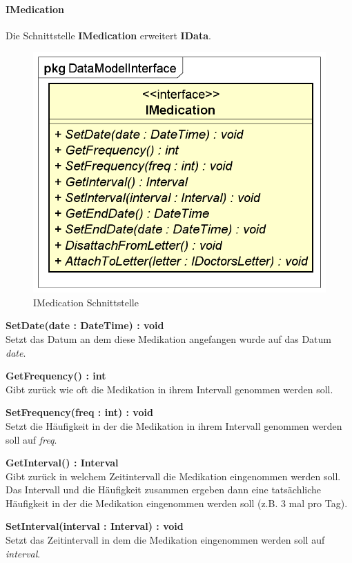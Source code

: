 \documentclass[a4paper]{scrreprt}
\begin{document}
\paragraph{IMedication}
Die Schnittstelle \textbf{IMedication} erweitert \textbf{IData}.

\begin{figure}[H]
\centering
\includegraphics[width=0.55\textheight]{graphics/Klassendiagramme/Model/IMedication.png}
\caption{IMedication Schnittstelle}
\end{figure}
\textbf{SetDate(date : DateTime) : void}\\
Setzt das Datum an dem diese Medikation angefangen wurde auf das Datum \textit{date}.

\textbf{GetFrequency() : int}\\
Gibt zurück wie oft die Medikation in ihrem Intervall genommen werden soll.

\textbf{SetFrequency(freq : int) : void}\\
Setzt die Häufigkeit in der die Medikation in ihrem Intervall genommen werden soll auf \textit{freq}.

\textbf{GetInterval() : Interval}\\
Gibt zurück in welchem Zeitintervall die Medikation eingenommen werden soll. Das Intervall und die Häufigkeit zusammen ergeben dann eine tatsächliche Häufigkeit in der die Medikation eingenommen werden soll (z.B. 3 mal pro Tag).

\textbf{SetInterval(interval : Interval) : void}\\
Setzt das Zeitintervall in dem die Medikation eingenommen werden soll auf \textit{interval}.
\end{document}
